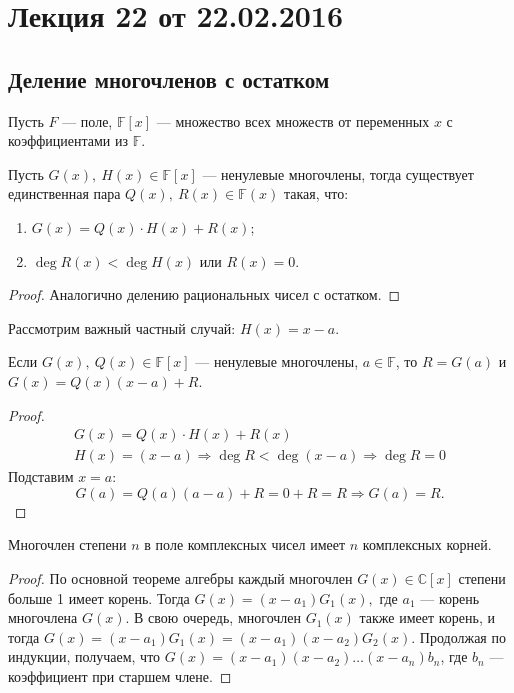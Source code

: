 


\renewcommand{\phi}{\varphi}

\section{Лекция 22 от 22.02.2016}

\subsection*{Деление многочленов с остатком}

Пусть $F$ --- поле, $\mathbb{F}[x]$ --- множество всех множеств от переменных $x$ с коэффициентами из $\mathbb{F}$.
\begin{Theorem}
	Пусть $G(x),\ H(x) \in \mathbb{F}[x]$ --- ненулевые многочлены, тогда существует единственная пара $Q(x),\ R(x) \in \mathbb{F}(x)$ такая, что:
	\begin{enumerate}
		\item $G(x) = Q(x)\cdot H(x) + R(x)$;
		\item $\deg  R(x) < \deg  H(x)$ или $R(x) = 0$.
	\end{enumerate}
\end{Theorem}

\begin{proof}
Аналогично делению рациональных чисел с остатком.
\end{proof}

Рассмотрим важный частный случай: $H(x) = x - a$. 

\begin{Theorem}[Безу]
	Если $G(x),\ Q(x) \in \mathbb{F}[x]$ --- ненулевые многочлены, $a \in \mathbb{F}$, то $R = G(a)$ и $G(x) = Q(x)(x - a) + R$.
\end{Theorem}

\begin{proof}
\begin{gather*}
	G(x) = Q(x)\cdot H(x) + R(x) \\
	H(x) = (x - a) \Rightarrow \deg R < \deg (x - a) \Rightarrow \deg R = 0
\end{gather*}
	Подставим $x = a$:
	$$G(a) = Q(a)(a-a) + R = 0 + R = R \Rightarrow G(a) = R.$$
\end{proof}

\begin{Theorem}
	Многочлен степени $n$ в поле комплексных чисел имеет $n$ комплексных корней.
\end{Theorem}

\begin{proof}
	По основной теореме алгебры каждый многочлен $G(x) \in \mathbb{C}[x]$ степени больше 1 имеет корень. Тогда $G(x) = (x - a_1)G_1(x),$ где $a_1$ --- корень многочлена $G(x)$. В свою очередь, многочлен $G_1(x)$ также имеет корень, и тогда $G(x) = (x - a_1)G_1(x) = (x - a_1)(x - a_2)G_2(x)$. Продолжая по индукции, получаем, что $G(x) = (x - a_1)(x - a_2)\ldots(x - a_n)b_n$, где $b_n$ --- коэффициент при старшем члене.
\end{proof}

